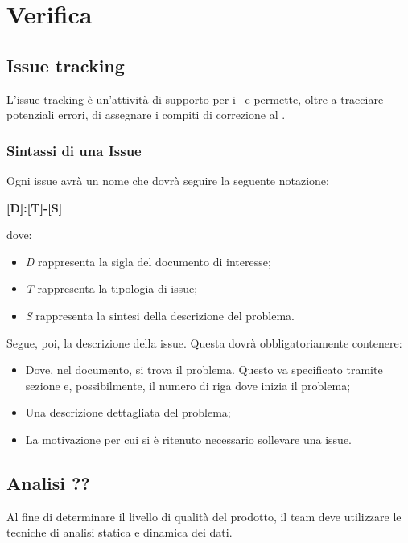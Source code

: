 \documentclass[../NormeProgetto.tex]{subfiles}
\begin{document}
	\section{Verifica}
		\subsection{Issue tracking}
		L'issue tracking è un'attività di supporto per i \verificatori\ e permette, oltre a tracciare potenziali errori, di assegnare i compiti di correzione al \responsabilediprogetto.
			\subsubsection{Sintassi di una Issue}
			Ogni issue avrà un nome che dovrà seguire la seguente notazione: \begin{center}\textbf{[D]:[T]-[S]}\end{center} dove:
			\begin{itemize} 
				\item \textit{D} rappresenta la sigla del documento di interesse;
				\item \textit{T} rappresenta la tipologia di issue;
				\item \textit{S} rappresenta la sintesi della descrizione del problema.
			\end{itemize}
			Segue, poi, la descrizione della issue. Questa dovrà obbligatoriamente contenere:
			\begin{itemize} 
				\item Dove, nel documento, si trova il problema. Questo va specificato tramite sezione e, possibilmente, il numero di riga dove inizia il problema;
				\item Una descrizione dettagliata del problema;
				\item La motivazione per cui si è ritenuto necessario sollevare una issue.
			\end{itemize}
		\subsection{Analisi ??}
		Al fine di determinare il livello di qualità del prodotto, il team deve utilizzare le tecniche di analisi statica e dinamica dei dati.
\end{document}

